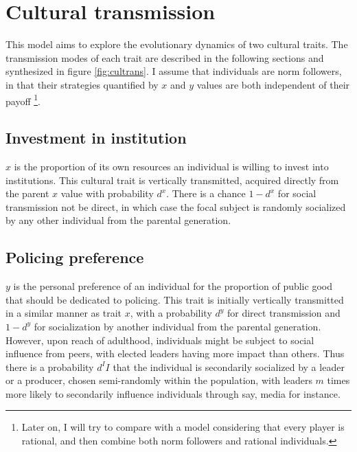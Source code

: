 \documentclass[a4paper]{article}
\begin{document}
\section{Cultural transmission}
\label{sec:trans}

This model aims to explore the evolutionary dynamics of two cultural traits. The transmission modes of each trait are described in the following sections and synthesized in figure \ref{fig:cultrans}. I assume that individuals are norm followers, in that their strategies quantified by $x$ and $y$ values are both independent of their payoff \footnote{Later on, I will try to compare with a model considering that every player is rational, and then combine both norm followers and rational individuals.}. 

\subsection{Investment in institution}

$x$ is the proportion of its own resources an individual is willing to invest into institutions. This cultural trait is vertically transmitted, acquired directly from the parent $x$ value with probability $d^x$. There is a chance $1-d^x$ for social transmission not be direct, in which case the focal subject is randomly socialized by any other individual from the parental generation.

\subsection{Policing preference}

$y$ is the personal preference of an individual for the proportion of public good that should be dedicated to policing. This trait is initially vertically transmitted in a similar manner as trait $x$, with a probability $d^y$ for direct transmission and $1-d^y$ for socialization by another individual from the parental generation. However, upon reach of adulthood, individuals might be subject to social influence from peers, with elected leaders having more impact than others. Thus there is a probability $d^II$ that the individual is secondarily socialized by a leader or a producer, chosen semi-randomly within the population, with leaders $m$ times more likely to secondarily influence individuals through say, media for instance.  
\end{document}
